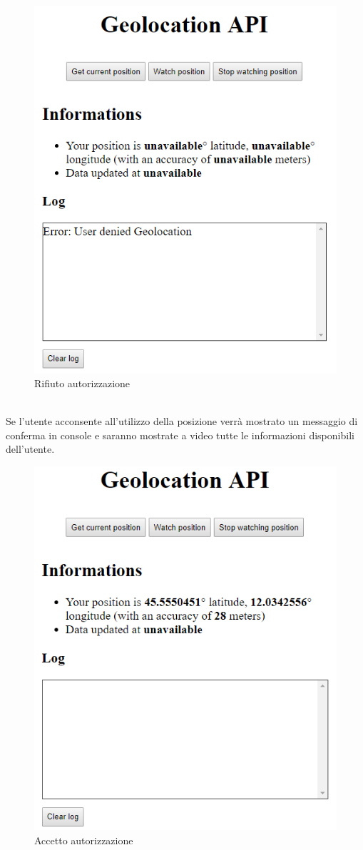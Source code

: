 \documentclass[11pt ,a4paper , twoside , openright ]{book}
\begin{document}
	\begin{figure}[h]
		\centering
		\includegraphics[width=0.4\linewidth]{geo3}
		\caption{Rifiuto autorizzazione}
		\label{fig: Rifiuto autorizzazione}
	\end{figure}
	\pagebreak
	\\
	Se l'utente acconsente all'utilizzo della posizione verrà mostrato un messaggio di conferma in console e saranno mostrate a video tutte le informazioni disponibili dell'utente.
	\begin{figure}[h]
		\centering
		\includegraphics[width=0.4\linewidth]{geo4}
		\caption{Accetto autorizzazione}
		\label{fig: Accetto autorizzazione}
	\end{figure}
	\\
	
	
\end{document}

